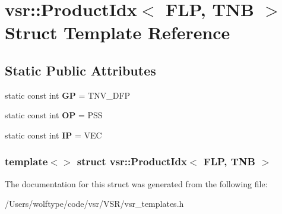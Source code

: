 \hypertarget{structvsr_1_1_product_idx_3_01_f_l_p_00_01_t_n_b_01_4}{\section{vsr\-:\-:Product\-Idx$<$ F\-L\-P, T\-N\-B $>$ Struct Template Reference}
\label{structvsr_1_1_product_idx_3_01_f_l_p_00_01_t_n_b_01_4}
}
\subsection*{Static Public Attributes}
\begin{DoxyCompactItemize}
\item 
\hypertarget{structvsr_1_1_product_idx_3_01_f_l_p_00_01_t_n_b_01_4_a96e594444ad64c8650d77523478b6bdd}{static const int {\bfseries G\-P} = T\-N\-V\-\_\-\-D\-F\-P}\label{structvsr_1_1_product_idx_3_01_f_l_p_00_01_t_n_b_01_4_a96e594444ad64c8650d77523478b6bdd}

\item 
\hypertarget{structvsr_1_1_product_idx_3_01_f_l_p_00_01_t_n_b_01_4_a1b96b603f2581f4e5a38c6b513ca922f}{static const int {\bfseries O\-P} = P\-S\-S}\label{structvsr_1_1_product_idx_3_01_f_l_p_00_01_t_n_b_01_4_a1b96b603f2581f4e5a38c6b513ca922f}

\item 
\hypertarget{structvsr_1_1_product_idx_3_01_f_l_p_00_01_t_n_b_01_4_a32126b8938b3f83271389b6943b92343}{static const int {\bfseries I\-P} = V\-E\-C}\label{structvsr_1_1_product_idx_3_01_f_l_p_00_01_t_n_b_01_4_a32126b8938b3f83271389b6943b92343}

\end{DoxyCompactItemize}
\subsubsection*{template$<$$>$ struct vsr\-::\-Product\-Idx$<$ F\-L\-P, T\-N\-B $>$}



The documentation for this struct was generated from the following file\-:\begin{DoxyCompactItemize}
\item 
/\-Users/wolftype/code/vsr/\-V\-S\-R/vsr\-\_\-templates.\-h\end{DoxyCompactItemize}
